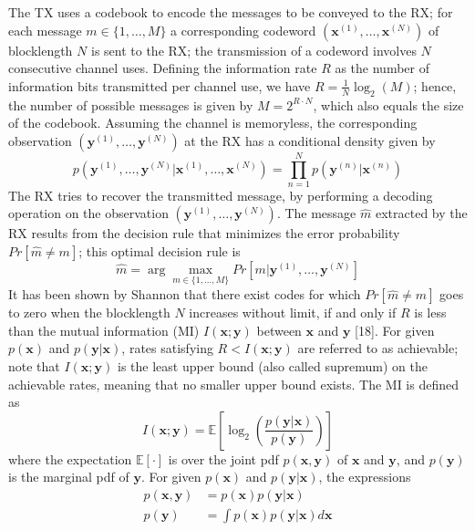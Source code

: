 \documentclass[11pt,a4paper]{report}
\begin{document}
The TX uses a codebook to encode the messages to be conveyed to the RX; for each message $m \in \{1, \dots, M\}$ a corresponding codeword $(\mathbf{x}^{(1)}, \dots, \mathbf{x}^{(N)})$ of blocklength $N$ is sent to the RX; the transmission of a codeword involves $N$ consecutive channel uses. Defining the information rate $R$ as the number of information bits transmitted per channel use, we have $R = \frac{1}{N} \log_2(M)$; hence, the number of possible messages is given by $M = 2^{R \cdot N}$, which also equals the size of the codebook. Assuming the channel is memoryless, the corresponding observation $(\mathbf{y}^{(1)}, \dots, \mathbf{y}^{(N)})$ at the RX has a conditional density given by
\begin{equation*}
    p(\mathbf{y}^{(1)}, \dots, \mathbf{y}^{(N)} | \mathbf{x}^{(1)}, \dots, \mathbf{x}^{(N)}) = \prod_{n=1}^N p(\mathbf{y}^{(n)} | \mathbf{x}^{(n)})
\end{equation*}
The RX tries to recover the transmitted message, by performing a decoding operation on the observation $(\mathbf{y}^{(1)}, \dots, \mathbf{y}^{(N)})$. The message $\hat{m}$ extracted by the RX results from the decision rule that minimizes the error probability $Pr[\hat{m} \neq m]$; this optimal decision rule is
\begin{equation*}
    \hat{m} = \arg \max_{m \in \{1, \dots, M\}} Pr[m | \mathbf{y}^{(1)}, \dots, \mathbf{y}^{(N)}]
\end{equation*}
It has been shown by Shannon that there exist codes for which $Pr[\hat{m} \neq m]$ goes to zero when the blocklength $N$ increases without limit, if and only if $R$ is less than the mutual information (MI) $I(\mathbf{x};\mathbf{y})$ between $\mathbf{x}$ and $\mathbf{y}$ [18]. For given $p(\mathbf{x})$ and $p(\mathbf{y}|\mathbf{x})$, rates satisfying $R < I(\mathbf{x};\mathbf{y})$ are referred to as achievable; note that $I(\mathbf{x};\mathbf{y})$ is the least upper bound (also called supremum) on the achievable rates, meaning that no smaller upper bound exists. The MI is defined as
\begin{equation}
    I(\mathbf{x};\mathbf{y}) = \mathbb{E} \left[ \log_2 \left( \frac{p(\mathbf{y}|\mathbf{x})}{p(\mathbf{y})} \right) \right]
\end{equation}
where the expectation $\mathbb{E}[\cdot]$ is over the joint pdf $p(\mathbf{x}, \mathbf{y})$ of $\mathbf{x}$ and $\mathbf{y}$, and $p(\mathbf{y})$ is the marginal pdf of $\mathbf{y}$. For given $p(\mathbf{x})$ and $p(\mathbf{y}|\mathbf{x})$, the expressions
\begin{align*}
    p(\mathbf{x}, \mathbf{y}) &= p(\mathbf{x}) p(\mathbf{y}|\mathbf{x}) \\
    p(\mathbf{y}) &= \int p(\mathbf{x}) p(\mathbf{y}|\mathbf{x}) d\mathbf{x}
\end{align*}
\end{document}
